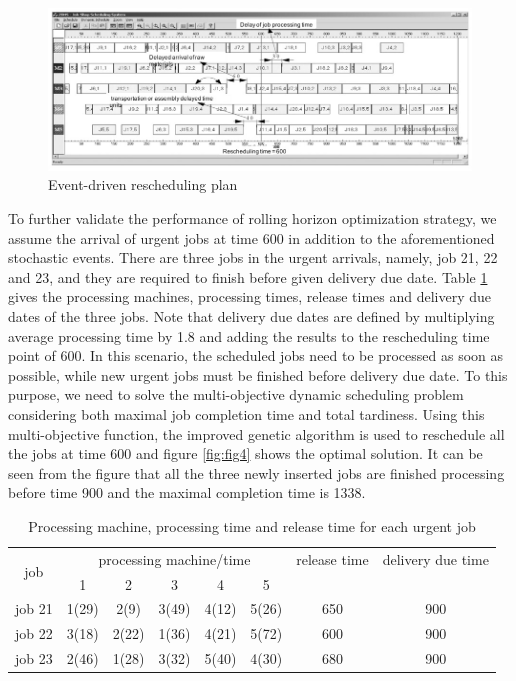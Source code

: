 \begin{figure}[h!]
	\begin{center}
		\includegraphics[width=1\linewidth]{sections/figure3.jpg}
		\caption{Event-driven rescheduling plan}
		\label{fig:fig3}
	\end{center}
\end{figure}


To further validate the performance of rolling horizon optimization strategy, we assume the arrival of urgent jobs at time 600 in addition to the aforementioned stochastic events.
There are three jobs in the urgent arrivals, namely, job 21, 22 and 23, and they are required to finish before given delivery due date.
Table \ref{tab:tab1} gives the processing machines, processing times, release times and delivery due dates of the three jobs.
Note that delivery due dates are defined by multiplying average processing time by 1.8 and adding the results to the rescheduling time point of 600.
In this scenario, the scheduled jobs need to be processed as soon as possible, while new urgent jobs must be finished before delivery due date.
To this purpose, we need to solve the multi-objective dynamic scheduling problem considering both maximal job completion time and total tardiness. 
Using this multi-objective function, the improved genetic algorithm is used to reschedule all the jobs at time 600 and figure \ref{fig:fig4} shows the optimal solution.
It can be seen from the figure that all the three newly inserted jobs are finished processing before time 900 and the maximal completion time is 1338.


\begin{table}[h!]
	\begin{center}
		\caption{Processing machine, processing time and release time for each urgent job}
		\label{tab:tab1}
		\begin{tabular}{cccccccc}
			\hline
			\multirow{2}{*}{job} & \multicolumn{5}{c}{processing machine/time} & release time & delivery due time \\
			\cline{2-6}
			& 1 & 2 & 3 & 4 & 5 & & \\
			\hline 
			job 21 & 1(29) & 2(9) & 3(49) & 4(12) & 5(26) & 650 & 900\\
			job 22 & 3(18) & 2(22) & 1(36) & 4(21) & 5(72) & 600 & 900 \\
			job 23 & 2(46) & 1(28) & 3(32) & 5(40) & 4(30) & 680 & 900 \\
			\hline
		\end{tabular}
	\end{center}
\end{table}




